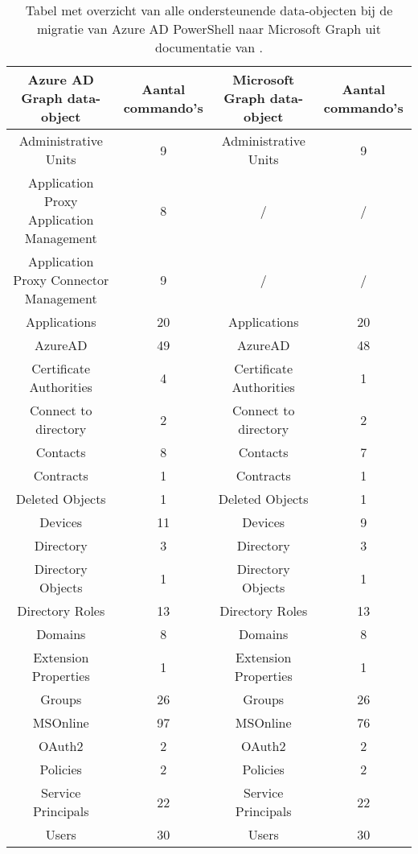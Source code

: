 \begin{table}
    \centering
    \begin{adjustbox}{max width=\textwidth}
    \begin{tabular}{ |c|c||c|c| } 
        \hline
        \textbf{Azure AD Graph data-object} & \textbf{Aantal commando's} & \textbf{Microsoft Graph data-object} & \textbf{Aantal commando's} \\
        \hline
        Administrative Units & 9 & Administrative Units & 9 \\ 
        Application Proxy Application Management & 8 & / & / \\
        Application Proxy Connector Management & 9 & / & / \\
        Applications & 20 & Applications & 20 \\ 
        AzureAD & 49 & AzureAD & 48 \\ 
        Certificate Authorities & 4 & Certificate Authorities & 1 \\ 
        Connect to directory & 2 & Connect to directory & 2 \\ 
        Contacts & 8 & Contacts & 7 \\ 
        Contracts & 1 & Contracts & 1 \\ 
        Deleted Objects & 1 & Deleted Objects & 1 \\ 
        Devices & 11 & Devices & 9 \\    
        Directory & 3 & Directory & 3 \\
        Directory Objects & 1 & Directory Objects & 1 \\ 
        Directory Roles & 13 & Directory Roles & 13 \\ 
        Domains & 8 & Domains & 8 \\ 
        Extension Properties & 1 & Extension Properties & 1 \\ 
        Groups & 26 & Groups & 26 \\ 
        MSOnline & 97 & MSOnline & 76 \\
        OAuth2 & 2 & OAuth2 & 2 \\ 
        Policies & 2 & Policies & 2 \\ 
        Service Principals & 22 & Service Principals & 22 \\ 
        Users & 30 & Users & 30 \\ 
        \hline
    \end{tabular}
    \end{adjustbox}
    \caption[Tabel migratie Azure AD data-objecten naar Microsoft Graph]{Tabel met overzicht van alle ondersteunende data-objecten bij de migratie van Azure \ac{AD} PowerShell naar Microsoft Graph uit documentatie van \textcite{Microsoft2023l}.}
    \label{AADMSG}
\end{table}

